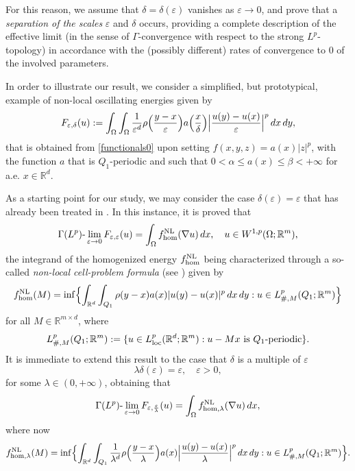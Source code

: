 \documentclass{article}
\theoremstyle{definition}
\newcommand{\e}{\varepsilon}
\newcommand{\R}{\mathbb{R}}
\begin{document}
For this reason, we assume that $\delta=\delta(\e)$ vanishes as $\e\to0$, and prove that a {\em separation of the scales} $\e$ and $\delta$ occurs, providing a complete description of the effective limit (in the sense of $\Gamma$-convergence with respect to the strong $L^p$-topology) in accordance with the (possibly different) rates of convergence to $0$ of the involved parameters. 

\smallskip

In order to illustrate our result, we consider a simplified, but prototypical, example of non-local oscillating energies given by
\begin{equation}\label{functionalproto}
  F_{\e,\delta}(u):=\int_\Omega\int_\Omega \frac{1}{\e^d}\rho\Bigl(\frac{y-x}{\e}\Bigr)a\Bigl(\frac{x}{\delta}\Bigr)\Bigl|\frac{u(y)-u(x)}{\e}\Bigr|^p\, dx\,dy,
\end{equation}
that is obtained from \eqref{functionals0} upon setting $f(x,y,z)=a(x)|z|^p$, with the function $a$ that is $Q_1$-periodic and such that $0<\alpha\leq a(x)\leq \beta<+\infty$ for a.e. $x\in \R^d$. 

As a starting point for our study, we may consider the case $\delta(\e)=\e$ that has already been treated in \cite{AABPT}. In this instance, it is proved that
\begin{equation*}
  \Gamma(L^p)\text{-}\lim_{\e\to0} F_{\e,\e}(u)  = \int_\Omega f_{\rm hom}^{\rm NL}(\nabla u)\, dx, \quad u\in W^{1,p}(\Omega;\R^m),
\end{equation*}
 the integrand of the homogenized energy $f_{\rm hom}^{\rm NL}$ being characterized through a so-called {\em non-local cell-problem formula} (see \cite[Theorem 6.2]{AABPT}) given by 
\begin{equation*}
      f_{\rm hom}^{\rm NL}(M)= \inf\Bigl\{ \int_{\R^d}\int_{Q_1} \rho(y-x) a(x)|u(y)-u(x)|^p\, dx\, dy : u\in L^p_{\#,M}(Q_1;\R^m) \Bigr\}
\end{equation*}
for all $M\in \R^{m\times d}$, where
\begin{equation*}
    L^p_{\#,M}(Q_1; \R^m):=\{u\in L^{p}_{\rm loc}(\R^d;\R^m) : u-Mx \text{ is } Q_1\text{-periodic}\}.
\end{equation*}
It is immediate to extend this result to the case that  $\delta$ is a multiple of $\e$
\begin{equation*}
    \lambda\delta(\e)=\e, \quad \e>0,
\end{equation*}
for some $\lambda\in(0,+\infty)$, obtaining that 
\begin{equation}\label{critical}
  \Gamma(L^p)\text{-}\lim_{\e\to0} F_{\e,\frac{\e}{\lambda}}(u)  = \int_\Omega f_{\rm hom, \lambda}^{\rm NL}(\nabla u)\, dx,
\end{equation}
where now
\begin{equation*}
      f_{\rm hom, \lambda}^{\rm NL}(M)= \inf\Bigl\{ \int_{\R^d}\int_{Q_1} \frac{1}{\lambda^d}\rho\Bigl(\frac{y-x}{\lambda}\Bigr) a(x)\Bigl|\frac{u(y)-u(x)}{\lambda}\Bigr|^p\, dx\, dy : u\in L^p_{\#,M}(Q_1;\R^m) \Bigr\}.
\end{equation*}
\end{document}
